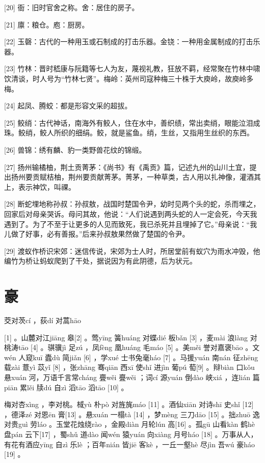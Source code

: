 \documentclass[12pt,UTF8]{ctexbook}
\begin{document}
[20] 衙：旧时官舍之称。舍：居住的房子。

[21] 廪：粮仓。庖：厨房。

[22] 玉磬：古代的一种用玉或石制成的打击乐器。金铙：一种用金属制成的打击乐器。

[23] 竹林：晋时嵇康与阮籍等七人为友，蔑视礼教，狂放不羁，经常聚在竹林中啸饮清谈，时人号为“竹林七贤”。梅岭：英州司寇种梅三十株于大庾岭，故庾岭多梅。

[24] 起凤、腾蛟：都是形容文采的超拔。

[25] 鲛绡：古代神话，南海外有鲛人，住在水中，善织绩，常出卖绡，眼能泣泪成珠。鲛绡，鲛人所织的细绢。鲛，就是鲨鱼。绡，生丝，又指用生丝织的东西。

[26] 兽锦：绣有麟、豹一类野兽花纹的锦缎。

[27] 扬州输橘柚，荆土贡菁茅：《尚书》有《禹贡》篇，记述九州的山川土宜，提出扬州要贡赋桔柚，荆州要贡献菁茅。菁茅，一种草类，古人用以扎神像，灌酒其上，表示神饮，叫祼。

[28] 断蛇埋地称孙叔：孙叔敖，战国时楚国令尹，幼时见两个头的蛇，杀而埋之，回家后对母亲哭诉。母问其故，他说：“人们说遇到两头蛇的人一定会死，今天我遇到了。为了不至于让更多的人见而致死，我已杀死并且埋掉了它。”母亲说：“我儿做了好事，必有善报。”后来孙叔敖果然做了楚国的令尹。

[29] 渡蚁作桥识宋郊：迷信传说，宋郊为士人时，所居堂前有蚁穴为雨水冲毁，他编竹为桥让蚂蚁爬到了干处，据说因为有此阴德，后为状元。





\chapter{豪}


茭对茨cí ，荻dí 对蒿hāo





[1] 。山麓对江jiāng 皋[2] 。莺yīng 簧huáng 对蝶dié 板bǎn [3] ，麦mài 浪làng 对桃涛tāo [4] 。骐骥jì 足zú ，凤fèng 凰huáng 毛máo [5] 。美měi 誉对嘉褒bāo 。文wén 人窥kuī 蠹dù 简jiǎn [6] ，学xué 士书兔毫háo [7] 。马援yuán 南nán 征zhēng 载zài 薏yì 苡yǐ [8] ，张zhāng 骞qiān 西xī 使shǐ 进jìn 葡pú 萄[9] 。辩biàn 口kǒu 悬xuán 河，万语千言常cháng 亹wěi 亹wěi ；词cí 源yuán 倒dào 峡xiá ，连lián 篇piān 累lěi 牍dú 自zì 滔tāo 滔tāo [10] 。

梅对杏xìng ，李对桃。棫yù 朴pò 对旌旄máo [11] 。酒仙xiān 对诗shī 史shǐ [12] ，德泽zé 对恩ēn 膏[13] 。悬xuán 一榻tà [14] ，梦mèng 三刀dāo [15] 。拙zhuō 逸对贵guì 劳láo 。玉堂花烛绕rào ，金殿diàn 月轮lún 高[16] 。孤gū 山看kàn 鹤hè 盘pán 云下[17] ，蜀shǔ 道dào 闻wén 猿yuán 向xiàng 月号háo [18] 。万事从人，有花有酒应yīng 自zì 乐lè ；百年nián 皆jiē 客kè ，一丘一壑hè 尽jìn 吾wú 豪háo [19] 。
\end{document}
